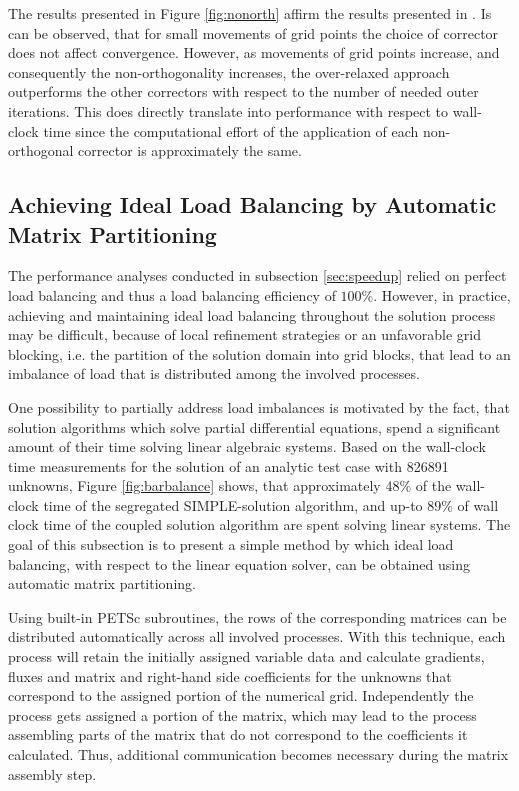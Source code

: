 The results presented in Figure \ref{fig:nonorth} affirm the results presented in \cite{jasak96}. Is can be observed, that for small movements of grid points the choice of corrector does not affect convergence. However, as movements of grid points increase, and consequently the non-orthogonality increases, the over-relaxed approach outperforms the other correctors with respect to the number of needed outer iterations. This does directly translate into performance with respect to wall-clock time since the computational effort of the application of each non-orthogonal corrector is approximately the same.

\subsection{Achieving Ideal Load Balancing by Automatic Matrix Partitioning}

The performance analyses conducted in subsection \ref{sec:speedup} relied on perfect load balancing and thus a load balancing efficiency of \(100\%\). However, in practice, achieving and maintaining ideal load balancing throughout the solution process may be difficult, because of local refinement strategies or an unfavorable grid blocking, i.e. the partition of the solution domain into grid blocks, that lead to an imbalance of load that is distributed among the involved processes. 

One possibility to partially address load imbalances is motivated by the fact, that solution algorithms which solve partial differential equations, spend a significant amount of their time solving linear algebraic systems. Based on the wall-clock time measurements for the solution of an analytic test case with 826891 unknowns, Figure \ref{fig:barbalance} shows, that approximately \(48\%\) of the wall-clock time of the segregated SIMPLE-solution algorithm, and up-to \(89\%\) of wall clock time of the coupled solution algorithm are spent solving linear systems. The goal of this subsection is to present a simple method by which ideal load balancing, with respect to the linear equation solver, can be obtained using automatic matrix partitioning.

Using built-in PETSc subroutines, the rows of the corresponding matrices can be distributed automatically across all involved processes. With this technique, each process will retain the initially assigned variable data and calculate gradients, fluxes and matrix and right-hand side coefficients for the unknowns that correspond to the assigned portion of the numerical grid. Independently the process gets assigned a portion of the matrix, which may lead to the process assembling parts of the matrix that do not correspond to the coefficients it calculated. Thus, additional communication becomes necessary during the matrix assembly step.

